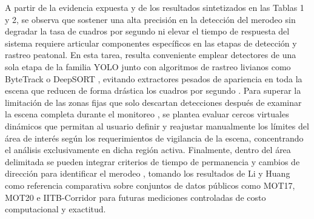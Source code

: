 \documentclass[runningheads]{llncs}
\begin{document}
A partir de la evidencia expuesta y de los resultados sintetizados en las Tablas 1 y 2, se observa que sostener una alta precisión en la detección del merodeo sin degradar la tasa de cuadros por segundo ni elevar el tiempo de respuesta del sistema requiere articular componentes específicos en las etapas de detección y rastreo peatonal. En esta tarea, resulta conveniente emplear detectores de una sola etapa de la familia YOLO junto con algoritmos de rastreo livianos como ByteTrack o DeepSORT \cite{lee2026,li2024,vu2026,zhang2023}, evitando extractores pesados de apariencia en toda la escena que reducen de forma drástica los cuadros por segundo \cite{li2024}. Para superar la limitación de las zonas fijas que solo descartan detecciones después de examinar la escena completa durante el monitoreo \cite{lee2026,fedosov2021,vu2026}, se plantea evaluar cercos virtuales dinámicos que permitan al usuario definir y reajustar manualmente los límites del área de interés según los requerimientos de vigilancia de la escena, concentrando el análisis exclusivamente en dicha región activa. Finalmente, dentro del área delimitada se pueden integrar criterios de tiempo de permanencia y cambios de dirección para identificar el merodeo \cite{jiang2022,li2024,m2022,zhang2023}, tomando los resultados de Li y Huang \cite{li2024} como referencia comparativa sobre conjuntos de datos públicos como MOT17, MOT20 e IITB-Corridor \cite{li2024,zhang2023} para futuras mediciones controladas de costo computacional y exactitud.
\end{document}
